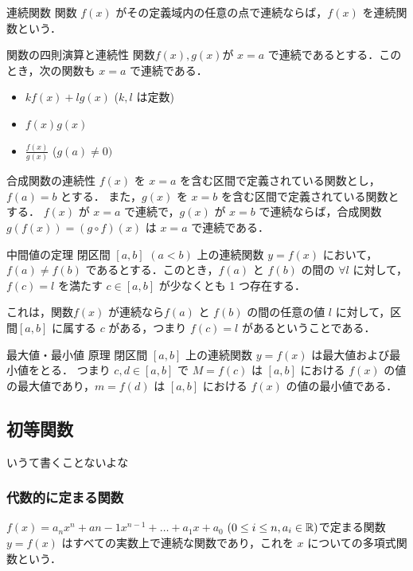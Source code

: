 \documentclass[xelatex,ja=standard,jafont=noto]{bxjsarticle}
\begin{document}
  \begin{tcb}{連続関数}{}
    関数 $f(x)$ がその定義域内の任意の点で連続ならば，$f(x)$ を連続関数という．
  \end{tcb}

  \begin{theorem}{関数の四則演算と連続性}{}
    関数$f(x), g(x)$が $x = a$ で連続であるとする．このとき，次の関数も $x=a$ で連続である．
    \begin{itemize}
      \item $kf(x) + lg(x)$ ($k, l$ は定数)
      \item $f(x)g(x)$
      \item $\frac{f(x)}{g(x)}$ ($g(a)\neq 0)$
    \end{itemize}
  \end{theorem}

  \begin{theorem}{合成関数の連続性}{}
    $f(x)$ を $x = a$ を含む区間で定義されている関数とし，$f(a) = b$ とする．
    また，$g(x)$ を $x = b$ を含む区間で定義されている関数とする．
    $f(x)$ が $x = a$ で連続で，$g(x)$ が $x = b$ で連続ならば，合成関数 $g(f(x)) = (g \circ f)(x)$ は $x=a$ で連続である．
  \end{theorem}

  \begin{theorem}{中間値の定理}{}
    閉区間 $[a, b]$ $(a < b)$ 上の連続関数 $y = f(x)$ において，$f(a) \neq f(b)$ であるとする．このとき，$f(a)$ と $f(b)$ の間の $\forall l$ に対して，$f(c) = l$ を満たす $c \in [a, b]$ が少なくとも 1 つ存在する．   
  \end{theorem}
  これは，関数$f(x)$ が連続なら$f(a)$ と $f(b)$ の間の任意の値 $l$ に対して，区間$[a, b]$ に属する $c$ がある，つまり $f(c) = l$ があるということである．

  \begin{theorem}{最大値・最小値 原理}{}
  閉区間 $[a, b]$ 上の連続関数 $y = f(x)$ は最大値および最小値をとる．
  つまり $c, d \in [a, b]$ で $M = f(c)$ は $[a, b]$ における $f(x)$ の値の最大値であり，$m = f(d)$ は $[a, b]$ における $f(x)$ の値の最小値である．
  \end{theorem}

  \subsection{初等関数}
  いうて書くことないよな
  \subsubsection{代数的に定まる関数}
  $f(x) = a_n x^n + a{n-1} x^{n-1} + \dots + a_1 x + a_0$ $(0 \leq i \leq n, a_i \in \mathbb{R})$で定まる関数 $y = f(x)$ はすべての実数上で連続な関数であり，これを $x$ についての多項式関数という．
\end{document}
